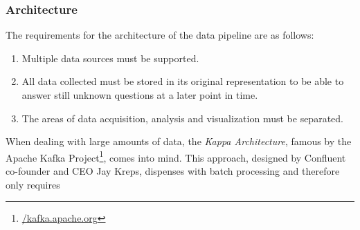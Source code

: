 \subsubsection{Architecture}
\label{subsubsec:architecture}
The requirements for the architecture of the data pipeline are as follows:
\begin{enumerate}
  \item Multiple data sources must be supported.
  \item All data collected must be stored in its original representation to be able to answer still unknown questions at a later point in time.
  \item The areas of data acquisition, analysis and visualization must be separated.
\end{enumerate}
When dealing with large amounts of data, the \textit{Kappa Architecture}, famous by the Apache Kafka Project\footnote{\href{https://kafka.apache.org/}{/kafka.apache.org}}, comes into mind. This approach, designed by Confluent co-founder and CEO Jay Kreps, dispenses with batch processing and therefore only requires
